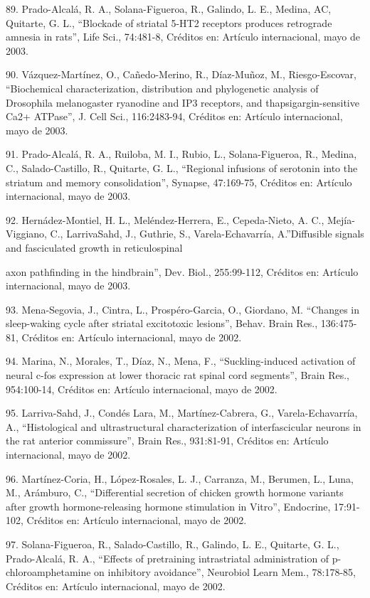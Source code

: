 89. Prado-Alcalá, R. A., Solana-Figueroa, R., Galindo, L. E., Medina, AC, Quitarte, G. L., “Blockade of striatal 5-HT2 
receptors produces retrograde amnesia in rats”, Life Sci., 74:481-8, Créditos en: Artículo internacional, mayo de 2003.

90. Vázquez-Martínez, O., Cañedo-Merino, R., Díaz-Muñoz, M., Riesgo-Escovar, “Biochemical characterization, distribution and 
phylogenetic analysis of Drosophila melanogaster ryanodine and IP3 receptors, and thapsigargin-sensitive Ca2+ ATPase”, J. Cell 
Sci., 116:2483-94, Créditos en: Artículo internacional, mayo de 2003.

91. Prado-Alcalá, R. A., Ruiloba, M. I., Rubio, L., Solana-Figueroa, R., Medina, C., Salado-Castillo, R., Quitarte, G. L., 
“Regional infusions of serotonin into the striatum and memory consolidation”, Synapse, 47:169-75, Créditos en: Artículo 
internacional, mayo de 2003.

92. Hernádez-Montiel, H. L., Meléndez-Herrera, E., Cepeda-Nieto, A. C., Mejía-Viggiano, C., LarrivaSahd, J., Guthrie, S., 
Varela-Echavarría, A.”Diffusible signals and fasciculated growth in reticulospinal

axon pathfinding in the hindbrain”, Dev. Biol., 255:99-112, Créditos en: Artículo internacional, mayo de 2003.

93. Mena-Segovia, J., Cintra, L., Prospéro-Garcia, O., Giordano, M. “Changes in sleep-waking cycle after striatal excitotoxic 
lesions”, Behav. Brain Res., 136:475-81, Créditos en: Artículo internacional, mayo de 2002.

94. Marina, N., Morales, T., Díaz, N., Mena, F., “Suckling-induced activation of neural c-fos expression at lower thoracic rat 
spinal cord segments”, Brain Res., 954:100-14, Créditos en: Artículo internacional, mayo de 2002.

95. Larriva-Sahd, J., Condés Lara, M., Martínez-Cabrera, G., Varela-Echavarría, A., “Histological and ultrastructural 
characterization of interfascicular neurons in the rat anterior commissure”, Brain Res., 931:81-91, Créditos en: Artículo 
internacional, mayo de 2002.

96. Martínez-Coria, H., López-Rosales, L. J., Carranza, M., Berumen, L., Luna, M., Arámburo, C., “Differential secretion of 
chicken growth hormone variants after growth hormone-releasing hormone stimulation in Vitro”, Endocrine, 17:91-102, Créditos 
en: Artículo internacional, mayo de 2002.

97. Solana-Figueroa, R., Salado-Castillo, R., Galindo, L. E., Quitarte, G. L., Prado-Alcalá, R. A., “Effects of pretraining 
intrastriatal administration of p-chloroamphetamine on inhibitory avoidance”, Neurobiol Learn Mem., 78:178-85, Créditos en: 
Artículo internacional, mayo de 2002.

